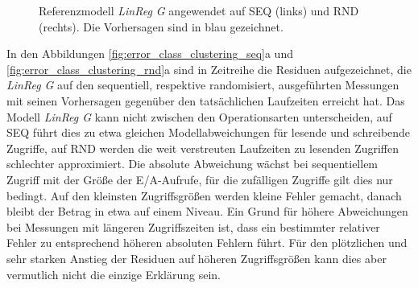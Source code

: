 \documentclass[
	twoside,
	12pt,
	a4paper,
	BCOR10mm,
	DIV14,
	listof=totoc,
	bibliography=totoc,
	headsepline
]{scrreprt}
\begin{document}
\begin{figure}[!b]
	\centering
	\hfill
	\caption{Referenzmodell \textit{LinReg G} angewendet auf SEQ (links) und RND (rechts). Die Vorhersagen sind in blau gezeichnet.}
	\label{fig:vorgriff_linreg}
\end{figure} 

In den Abbildungen \ref{fig:error_class_clustering_seq}a und \ref{fig:error_class_clustering_rnd}a sind in Zeitreihe die Residuen aufgezeichnet, die \textit{LinReg G} auf den sequentiell, respektive randomisiert, ausgeführten Messungen mit seinen Vorhersagen gegenüber den tatsächlichen Laufzeiten erreicht hat.
Das Modell \textit{LinReg G} kann nicht zwischen den Operationsarten unterscheiden, auf SEQ führt dies zu etwa gleichen Modellabweichungen für lesende und schreibende Zugriffe, auf RND werden die weit verstreuten Laufzeiten zu lesenden Zugriffen schlechter approximiert.
Die absolute Abweichung wächst bei sequentiellem Zugriff mit der Größe der E/A-Aufrufe, für die zufälligen Zugriffe gilt dies nur bedingt. Auf den kleinsten Zugriffsgrößen werden kleine Fehler gemacht, danach bleibt der Betrag in etwa auf einem Niveau.
Ein Grund für höhere Abweichungen bei Messungen mit längeren Zugriffszeiten ist, dass ein bestimmter relativer Fehler zu entsprechend höheren absoluten Fehlern führt.
Für den plötzlichen und sehr starken Anstieg der Residuen auf höheren Zugriffsgrößen kann dies aber vermutlich nicht die einzige Erklärung sein.
\end{document}
